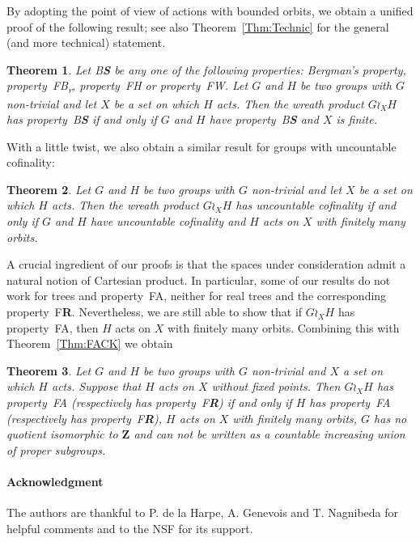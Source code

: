 \documentclass[a4paper]{article}
\newtheorem{mainthm}{Theorem}
\theoremstyle{definition}
\newcommand*{\field}[1]{\mathbf{#1}}
\newcommand*{\Z}{\field{Z}}
\newcommand*{\BS}{B\textbf{S}}
\newcommand*{\FB}{FB\textsubscript{r}}
\newcommand*{\FH}{FH}
\newcommand*{\FW}{FW}
\newcommand*{\FA}{FA}
\newcommand*{\FR}{F\textbf{R}}
\begin{document}
By adopting the point of view of actions with bounded orbits, we obtain a unified proof of the following result; see also Theorem~\ref{Thm:Technic} for the general (and more technical) statement.
%
%
\begin{mainthm}\label{Thm:Main}
Let \BS{} be any one of the following properties: Bergman's property, property~\FB, property~\FH{} or property~\FW.
Let $G$ and $H$ be two groups with $G$ non-trivial and let $X$ be a set on which $H$ acts.
Then the wreath product $G \wr_X H$ has property~\BS{} if and only if $G$ and $H$ have property~\BS{} and $X$ is finite.
\end{mainthm}
%
%
With a little twist, we also obtain a similar result for groups with uncountable cofinality:
\begin{mainthm}\label{Thm:UncCoun}
Let $G$ and $H$ be two groups with $G$ non-trivial and let $X$ be a set on which $H$ acts.
Then the wreath product $G \wr_X H$ has uncountable cofinality if and only if $G$ and $H$ have uncountable cofinality and $H$ acts on $X$ with finitely many orbits.
\end{mainthm}
%
%
A crucial ingredient of our proofs is that the spaces under consideration admit a natural notion of Cartesian product.
In particular, some of our results do not work for trees and property~\FA, neither for real trees and the corresponding property~\FR.
Nevertheless, we are still able to show that if $G\wr_XH$ has property~\FA, then $H$ acts on $X$ with finitely many orbits.
Combining this with Theorem~\ref{Thm:FACK} we obtain
\begin{mainthm}\label{Thm:FAFiniteOrbits}
Let $G$ and $H$ be two groups with $G$ non-trivial and $X$ a set on which $H$ acts. Suppose that $H$ acts on $X$ without fixed points.
Then $G\wr_XH$ has property~\FA{} (respectively has property~\FR) if and only if $H$ has property~\FA{} (respectively has property~\FR), $H$ acts on $X$ with finitely many orbits, $G$ has no quotient isomorphic to $\Z$ and can not be written as a countable increasing union of proper subgroups.
\end{mainthm}
%
%
%
%
%
%
\paragraph{Acknowledgment}
The authors are thankful to P. de la Harpe, A. Genevois and T. Nagnibeda for helpful comments and to the NSF for its support.
%
%
%
%
%
%
%
%
%
%
%
%
%
\end{document}
